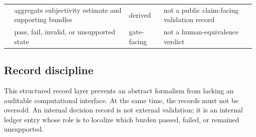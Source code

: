 \documentclass[11pt,a4paper]{article}
\theoremstyle{definition}
\begin{document}
\begin{table}[t]
\begin{tabularx}{\textwidth}{@{}p{}p{}p{}Y@{}}
\texttt{\allowbreak{}\allowbreak{}\allowbreak{}\allowbreak{}} & aggregate subjectivity estimate and supporting bundles & derived & not a public claim-facing validation record \\
\texttt{\allowbreak{}\allowbreak{}\allowbreak{}} & pass, fail, invalid, or unsupported state & gate-facing & not a human-equivalence verdict \\
\bottomrule
\end{tabularx}
\end{table}

\subsection{Record discipline}
This structured record layer prevents an abstract formalism from lacking an auditable computational interface. At the same time, the records must not be oversold. An internal \texttt{\allowbreak{}\allowbreak{}\allowbreak{}} decision record is not external validation; it is an internal ledger entry whose role is to localize which burden passed, failed, or remained unsupported.
\end{document}
